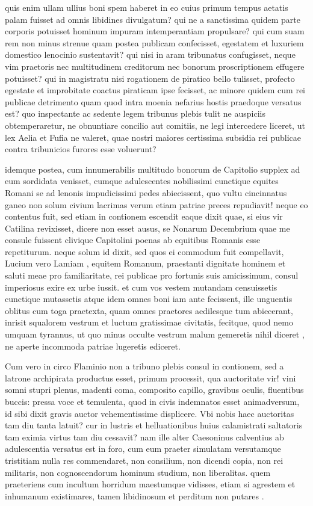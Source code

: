  quis enim ullam ullius boni spem haberet in eo cuius primum tempus aetatis palam fuisset ad omnis libidines divulgatum? qui ne a sanctissima quidem parte corporis potuisset hominum impuram intemperantiam propulsare? qui cum suam rem non minus strenue quam postea publicam confecisset, egestatem et luxuriem domestico lenocinio sustentavit? qui nisi in aram tribunatus confugisset, neque vim praetoris nec multitudinem creditorum nec bonorum proscriptionem effugere potuisset? qui in magistratu nisi rogationem de piratico bello tulisset, profecto egestate et improbitate coactus piraticam ipse fecisset, ac minore quidem cum rei publicae detrimento quam quod intra moenia nefarius hostis praedoque versatus est? quo inspectante ac sedente legem tribunus plebis tulit ne auspiciis obtemperaretur, ne obnuntiare concilio aut comitiis, ne legi intercedere liceret, ut lex Aelia et Fufia ne valeret, quae nostri maiores certissima subsidia rei publicae contra tribunicios furores esse voluerunt?

 idemque postea, cum innumerabilis multitudo bonorum de Capitolio supplex ad eum sordidata venisset, cumque adulescentes nobilissimi cunctique equites Romani se ad lenonis impudicissimi pedes abiecissent, quo vultu cincinnatus ganeo non solum civium lacrimas verum etiam patriae preces repudiavit! neque eo contentus fuit, sed etiam in contionem escendit eaque dixit quae, si eius vir Catilina revixisset, dicere non esset ausus, se Nonarum Decembrium quae me consule fuissent clivique Capitolini poenas ab equitibus Romanis esse repetiturum. neque solum id dixit, sed quos ei commodum fuit compellavit, Lucium vero Lamiam , equitem Romanum, praestanti dignitate hominem et saluti meae pro familiaritate, rei publicae pro fortunis suis amicissimum, consul imperiosus exire ex urbe iussit. et cum vos vestem mutandam censuissetis cunctique mutassetis atque idem omnes boni iam ante fecissent, ille unguentis oblitus cum toga praetexta, quam omnes praetores aedilesque tum abiecerant, inrisit squalorem vestrum et luctum gratissimae civitatis, fecitque, quod nemo umquam tyrannus, ut quo minus occulte vestrum malum gemeretis nihil diceret , ne aperte incommoda patriae lugeretis ediceret.

 Cum vero in circo Flaminio non a tribuno plebis consul in contionem, sed a latrone archipirata productus esset, primum processit, qua auctoritate vir! vini somni stupri plenus, madenti coma, composito capillo, gravibus oculis, fluentibus buccis: pressa voce et temulenta, quod in civis indemnatos esset animadversum, id sibi dixit gravis auctor vehementissime displicere. Vbi nobis haec auctoritas tam diu tanta latuit? cur in lustris et helluationibus huius calamistrati saltatoris tam eximia virtus tam diu cessavit? nam ille alter Caesoninus calventius ab adulescentia versatus est in foro, cum eum praeter simulatam versutamque tristitiam nulla res commendaret, non consilium, non dicendi copia, non rei militaris, non cognoscendorum hominum studium, non liberalitas. quem praeteriens cum incultum horridum maestumque vidisses, etiam si agrestem et inhumanum existimares, tamen libidinosum et perditum non putares .

